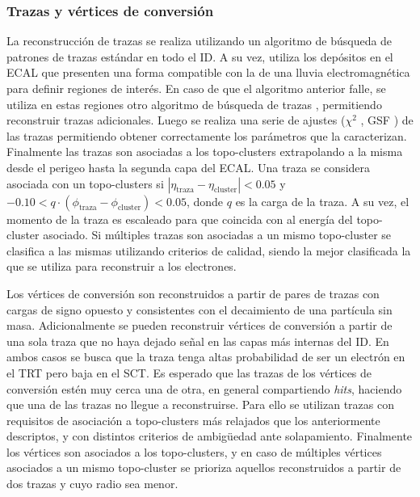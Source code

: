 
\subsubsection{Trazas y vértices de conversión}

La reconstrucción de trazas se realiza utilizando un algoritmo de búsqueda de patrones de trazas estándar
\cite{newt, PERF-2017-02, PERF-2017-01} en todo el ID. A su vez, utiliza los depósitos en el ECAL que presenten una forma compatible con la de una lluvia electromagnética para definir regiones de interés. En caso de que el algoritmo anterior falle, se utiliza en estas regiones otro algoritmo de búsqueda de trazas \cite{Kalman}, permitiendo reconstruir trazas adicionales. Luego se realiza una serie de ajustes ($\chi^2$ \cite{chi2}, GSF \cite{gsf}) de las trazas permitiendo obtener correctamente los parámetros que la caracterizan. Finalmente las trazas son asociadas a los topo-clusters extrapolando a la misma desde el perigeo hasta la segunda capa del ECAL. Una traza se considera asociada con un topo-clusters si $|\eta_{\text{traza}}-\eta_{\text{cluster}}|<0.05$ y $-0.10<q\cdot(\phi_{\text{traza}}-\phi_{\text{cluster}})<0.05$, donde $q$ es la carga de la traza. A su vez, el momento de la traza es escaleado para que coincida con al energía del topo-cluster asociado. Si múltiples trazas son asociadas a un mismo topo-cluster se clasifica a las mismas utilizando criterios de calidad, siendo la mejor clasificada la que se utiliza para reconstruir a los electrones. 

Los vértices de conversión son reconstruidos a partir de pares de trazas con cargas de signo opuesto y consistentes con el decaimiento de una partícula sin masa. Adicionalmente se pueden reconstruir vértices de conversión a partir de una sola traza que no haya dejado señal en las capas más internas del ID. En ambos casos se busca que la traza tenga altas probabilidad de ser un electrón en el TRT \cite{trt} pero baja en el SCT. Es esperado que las trazas de los vértices de conversión estén muy cerca una de otra, en general compartiendo \textit{hits}, haciendo que una de las trazas no llegue a reconstruirse. Para ello se utilizan trazas con requisitos de asociación a topo-clusters más relajados que los anteriormente descriptos, y con distintos criterios de ambigüedad ante solapamiento. Finalmente los vértices son asociados a los topo-clusters, y en caso de múltiples vértices asociados a un mismo topo-cluster se prioriza aquellos reconstruidos a partir de dos trazas y cuyo radio sea menor.

